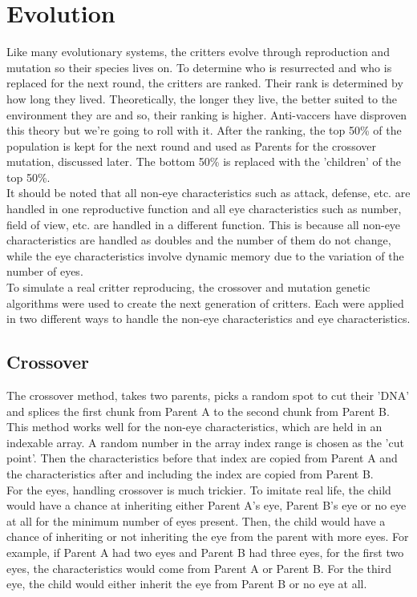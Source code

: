 
\chapter{Evolution}
\label{chap:reproduction}

Like many evolutionary systems, the critters evolve through reproduction and mutation so their species lives on. To determine who is resurrected and who is replaced for the next round, the critters are ranked. Their rank is determined by how long they lived. Theoretically, the longer they live, the better suited to the environment they are and so, their ranking is higher. Anti-vaccers have disproven this theory but we're going to roll with it. After the ranking, the top 50\% of the population is kept for the next round and used as Parents for the crossover mutation, discussed later. The bottom 50\% is replaced with the 'children' of the top 50\%. \\
\newline
It should be noted that all non-eye characteristics such as attack, defense, etc. are handled in one reproductive function and all eye characteristics such as number, field of view, etc. are handled in a different function. This is because all non-eye characteristics are handled as doubles and the number of them do not change, while the eye characteristics involve dynamic memory due to the variation of the number of eyes. \\
\newline
To simulate a real critter reproducing, the crossover and mutation genetic algorithms were used to create the next generation of critters. Each were applied in two different ways to handle the non-eye characteristics and eye characteristics. 

\section{Crossover}
The crossover method, takes two parents, picks a random spot to cut their 'DNA' and splices the first chunk from Parent A to the second chunk from Parent B. This method works well for the non-eye characteristics, which are held in an indexable array. A random number in the array index range is chosen as the 'cut point'. Then the characteristics before that index are copied from Parent A and the characteristics after and including the index are copied from Parent B. \\

For the eyes, handling crossover is much trickier. To imitate real life, the child would have a chance at inheriting either Parent A's eye, Parent B's eye or no eye at all for the minimum number of eyes present. Then, the child would have a chance of inheriting or not inheriting the eye from the parent with more eyes. For example, if Parent A had two eyes and Parent B had three eyes, for the first two eyes, the characteristics would come from Parent A or Parent B. For the third eye, the child would either inherit the eye from Parent B or no eye at all. 


